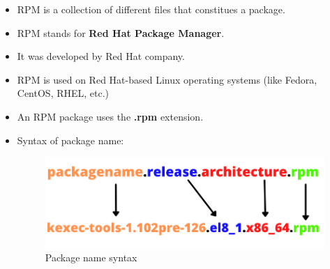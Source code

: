 \setlength{\columnsep}{3pt}
\begin{flushleft}
	\bigskip
	\begin{itemize}
		\item RPM is a collection of different files that constitues a package.
		\item RPM stands for \textbf{Red Hat Package Manager}.
		\item It was developed by Red Hat company.
		\item RPM is used on Red Hat-based Linux operating systems (like Fedora, CentOS, RHEL, etc.)
		\item An RPM package uses the \textbf{.rpm} extension.

		\bigskip
		\item Syntax of package name:
		\begin{figure}[h!]
			\centering
			\includegraphics[scale=.5]{content/chapter11/images/package2.png}
			\caption{Package name syntax}
			\label{fig:package_name}
		\end{figure}
	\end{itemize}
\end{flushleft}
\newpage


